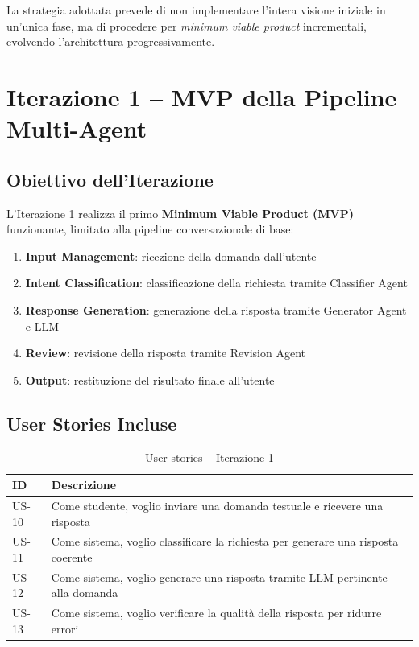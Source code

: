 \documentclass[a4paper,12pt]{report}
\begin{document}
La strategia adottata prevede di non implementare l'intera visione iniziale in un'unica fase, ma di procedere per \textit{minimum viable product} incrementali, evolvendo l'architettura progressivamente.


\chapter{Iterazione 1 -- MVP della Pipeline Multi-Agent}

\section{Obiettivo dell'Iterazione}

L'Iterazione 1 realizza il primo \textbf{Minimum Viable Product (MVP)} funzionante, limitato alla pipeline conversazionale di base:
\begin{enumerate}
    \item \textbf{Input Management}: ricezione della domanda dall'utente
    \item \textbf{Intent Classification}: classificazione della richiesta tramite Classifier Agent
    \item \textbf{Response Generation}: generazione della risposta tramite Generator Agent e LLM
    \item \textbf{Review}: revisione della risposta tramite Revision Agent
    \item \textbf{Output}: restituzione del risultato finale all'utente
\end{enumerate}

\section{User Stories Incluse}

\begin{table}[H]
\centering
\begin{tabularx}{\textwidth}{l X}
\toprule
\textbf{ID} & \textbf{Descrizione} \\
\midrule
US-10 & Come studente, voglio inviare una domanda testuale e ricevere una risposta \\
US-11 & Come sistema, voglio classificare la richiesta per generare una risposta coerente \\
US-12 & Come sistema, voglio generare una risposta tramite LLM pertinente alla domanda \\
US-13 & Come sistema, voglio verificare la qualità della risposta per ridurre errori \\
\bottomrule
\end{tabularx}
\caption{User stories -- Iterazione 1}
\end{table}
\end{document}
